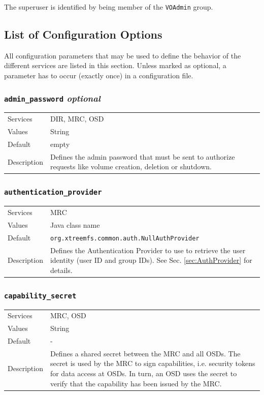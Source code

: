 \documentclass[a4paper,10pt]{book}
\begin{document}
The superuser is identified by being member of the \texttt{VOAdmin} group.

\subsection{List of Configuration Options}
\label{sec:config}

All configuration parameters that may be used to define the behavior of the different services are listed in this section. Unless marked as optional, a parameter has to occur (exactly once) in a configuration file.


\subsubsection{\texttt{admin\_password} \textit{optional}}
\begin{tabular}{lp{10cm}}
 Services & DIR, MRC, OSD\\
 Values   & String \\
 Default  & empty\\
 Description & Defines the admin password that must be sent to authorize requests like volume creation, deletion or shutdown.
\end{tabular}

\subsubsection{\texttt{authentication\_provider}}
\begin{tabular}{lp{10cm}}
 Services & MRC\\
 Values   & Java class name \\
 Default  & \texttt{org.xtreemfs.common.auth.NullAuthProvider}\\
 Description & Defines the Authentication Provider to use to retrieve the user identity (user ID and group IDs). See Sec. \ref{sec:AuthProvider} for details.
\end{tabular}

\subsubsection{\texttt{capability\_secret}}
\begin{tabular}{lp{10cm}}
 Services & MRC, OSD\\
 Values   & String \\
 Default  & - \\
 Description & Defines a shared secret between the MRC and all OSDs. The secret is used by the MRC to sign capabilities, i.e. security tokens for data access at OSDs. In turn, an OSD uses the secret to verify that the capability has been issued by the MRC.
\end{tabular}
\end{document}
